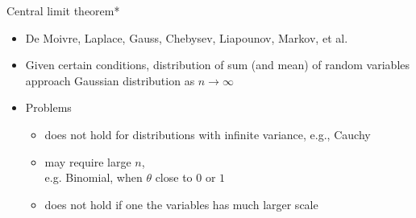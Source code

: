 \documentclass[english,t]{beamer}
\begin{document}

\begin{frame}
{Central limit theorem*}

  \begin{itemize}
  \item De Moivre, Laplace, Gauss, Chebysev, Liapounov, Markov, et al.
  \item Given certain conditions, distribution of sum (and mean) of
    random variables approach Gaussian distribution as
    $n \rightarrow \infty$
  \item Problems
    \begin{itemize}
    \item does not hold for distributions with infinite variance,
      e.g., Cauchy
    \item<2-> may require large $n$,\\ e.g.
      Binomial, when $\theta$ close to $0$ or $1$
    \item<3-> does not hold if one the variables has much larger scale
    \end{itemize}
  \end{itemize}

\end{frame}


\end{document}
